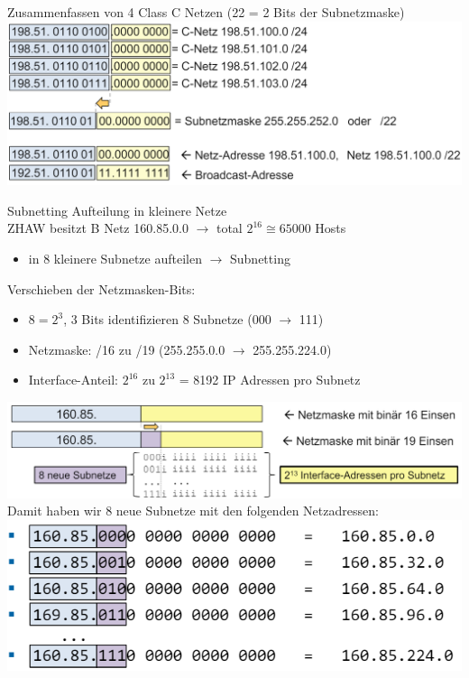 \begin{example}
    Zusammenfassen von 4 Class C Netzen (22 = 2 Bits der Subnetzmaske)\\
        \includegraphics[width=0.95\linewidth]{images/example_supernetting.png}
\end{example}

\begin{concept}{Subnetting}
    Aufteilung in kleinere Netze\\
    ZHAW besitzt B Netz 160.85.0.0 $\rightarrow$ total $2^{16} \cong 65000$  Hosts
    \begin{itemize}
        \item in 8 kleinere Subnetze aufteilen $\rightarrow$ Subnetting
    \end{itemize}
    Verschieben der Netzmasken-Bits: 
    \begin{itemize}
        \item $8 = 2^3$, 3 Bits identifizieren 8 Subnetze (000 $\rightarrow$ 111)
        \item Netzmaske: /16 zu /19 (255.255.0.0 $\rightarrow$ 255.255.224.0)
        \item Interface-Anteil: $2^{16}$ zu $2^{13}$ = 8192 IP Adressen pro Subnetz
    \end{itemize}
        \includegraphics[width=0.9\linewidth]{images/subnetting1.png}\\
    Damit haben wir 8 neue Subnetze mit den folgenden Netzadressen:\\
        \includegraphics[width=0.7\linewidth]{images/subnetting2.png}

\end{concept}
